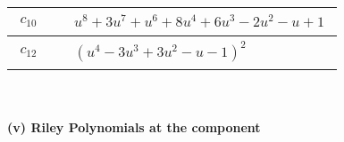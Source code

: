\documentclass[1p]{elsarticle_modified}
\theoremstyle{definition}
\begin{document}
\begin{tabular}{m{50pt}|m{274pt}}
\hline $$\begin{aligned}c_{10}\end{aligned}$$&$\begin{aligned}
&u^8+3 u^7+u^6+8 u^4+6 u^3-2 u^2- u+1
\end{aligned}$\\
\hline $$\begin{aligned}c_{12}\end{aligned}$$&$\begin{aligned}
&(u^4-3 u^3+3 u^2- u-1)^2
\end{aligned}$\\
\hline
\end{tabular}\\~\\
\newpage\renewcommand{\arraystretch}{1}
\flushleft \textbf{(v) Riley Polynomials at the component}\newline \\
\end{document}
